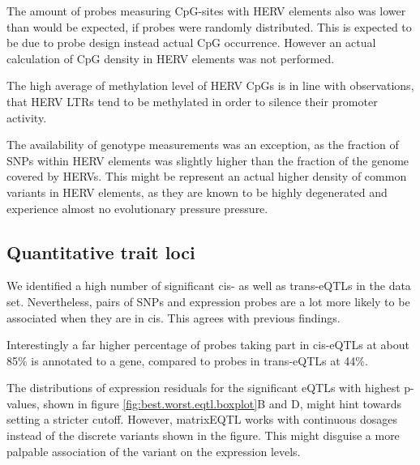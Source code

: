 \documentclass[a4paper,12pt,twoside,openright]{article}
\begin{document}
The amount of probes measuring CpG-sites with HERV elements also was lower than would be expected, if probes were randomly distributed. This is expected to be due to probe design instead actual CpG occurrence. However an actual calculation of CpG density in HERV elements was not performed. 

The high average of methylation level of HERV CpGs is in line with observations, that HERV LTRs tend to be methylated in order to silence their promoter activity\cite{Smith2013}.

The availability of genotype measurements was an exception, as the fraction of SNPs within HERV elements was slightly higher than the fraction of the genome covered by HERVs. This might be represent an actual higher density of common variants in HERV elements, as they are known to be highly degenerated and experience almost no evolutionary pressure pressure\cite{10.1146/annurev.genom.7.080505.115700}.

\subsection{Quantitative trait loci}
\label{Discussion:Quantitative trait loci}
We identified a high number of significant cis- as well as trans-eQTLs in the data set. Nevertheless, pairs of SNPs and expression probes are a lot more likely to be associated when they are in cis. This agrees with previous findings\cite{Joehanes2017}.

Interestingly a far higher percentage of probes taking part in cis-eQTLs at about 85\% is annotated to a gene, compared to probes in trans-eQTLs at 44\%. %
 
The distributions of expression residuals for the significant eQTLs with highest p-values, shown in figure \ref{fig:best.worst.eqtl.boxplot}B and D, might hint towards setting a stricter cutoff. However, matrixEQTL works with continuous dosages instead of the discrete variants shown in the figure. This might disguise a more palpable association of the variant on the expression levels.
\end{document}
